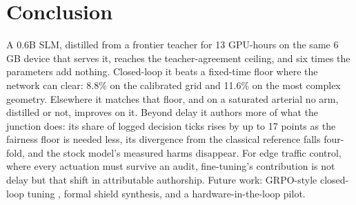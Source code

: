 \documentclass[conference]{IEEEtran}
\begin{document}
\section{Conclusion}\label{sec:conclusion}
A 0.6B SLM, distilled from a frontier teacher for 13 GPU-hours on the same
6\,GB device that serves it, reaches the teacher-agreement ceiling, and
six times the parameters add nothing. Closed-loop it beats a fixed-time
floor where the network can clear: 8.8\% on the calibrated grid and 11.6\%
on the most complex geometry. Elsewhere it matches that floor, and on a
saturated arterial no arm, distilled or not, improves on it. Beyond delay
it authors more of what the junction does: its share of logged decision ticks
rises by up to 17 points as the fairness floor is needed less, its
divergence from the classical reference falls four-fold, and the stock
model's measured harms disappear. For edge traffic control, where every
actuation must survive an audit, fine-tuning's contribution is not delay
but that shift in attributable authorship. Future work: GRPO-style
closed-loop tuning \cite{dglight2026}, formal shield synthesis, and a
hardware-in-the-loop
pilot.



\end{document}
